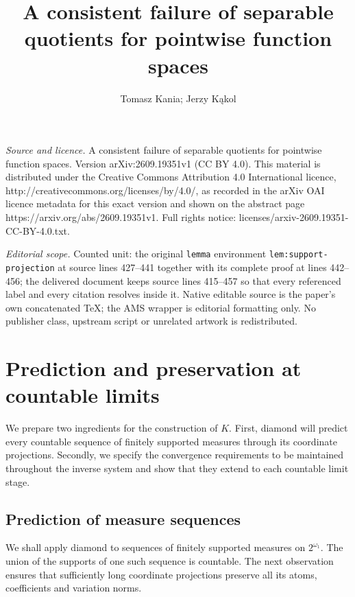 \documentclass[10pt,a4paper]{amsart}
\numberwithin{equation}{section}
\begin{document}
\title[A consistent failure of separable quotients for pointwise fu]{A consistent failure of separable quotients for pointwise function spaces}
\author{Tomasz Kania; Jerzy Kąkol}
\date{}
\maketitle
\noindent\emph{Source and licence.} A consistent failure of separable quotients for pointwise function spaces. Version arXiv:2609.19351v1 (CC BY 4.0). This material is distributed under the Creative Commons Attribution 4.0 International licence, http://creativecommons.org/licenses/by/4.0/, as recorded in the arXiv OAI licence metadata for this exact version and shown on the abstract page https://arxiv.org/abs/2609.19351v1. Full rights notice: licenses/arxiv-2609.19351-CC-BY-4.0.txt.\par\smallskip
\noindent\textit{Editorial scope.} Counted unit: the original \texttt{lemma} environment \texttt{lem:support-projection} at source lines 427--441 together with its complete proof at lines 442--456; the delivered document keeps source lines 415--457 so that every referenced label and every citation resolves inside it. Native editable source is the paper's own concatenated TeX; the AMS wrapper is editorial formatting only. No publisher class, upstream script or unrelated artwork is redistributed.
\section{Prediction and preservation at countable limits}\label{sec:limits}

We prepare two ingredients for the construction of $K$. First, diamond
will predict every countable sequence of finitely supported measures
through its coordinate projections. Secondly, we specify the convergence
requirements to be maintained throughout the inverse system and show
that they extend to each countable limit stage.

\subsection{Prediction of measure sequences}\label{subsec:prediction}

We shall apply diamond to sequences of finitely supported measures on $2^{\omega_1}$.  The union of the supports of one such sequence is countable.  The next observation ensures that sufficiently long coordinate projections preserve all its atoms, coefficients and variation norms.
\end{document}
